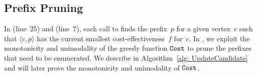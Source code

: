 
\subsection{Prefix Pruning}
\label{subsec: mono_upt}

In \Improved (line~25) and \PartialDijkstra (line~7), each call to \UpdateCandidate finds the prefix~$p$ for a given vertex~$c$ such that $\langle c,p \rangle$ has the current smallest cost-effectiveness~$f$ for~$c$. In \UpdateCandidate, we exploit the monotonicity and unimodality of the greedy function $\mathtt{Cost}$ to prune the prefixes that need to be enumerated. We describe \UpdateCandidate in Algorithm~\ref{alg: UpdateCandidate} and will later prove the monotonicity and unimodality of $\mathtt{Cost}$.


